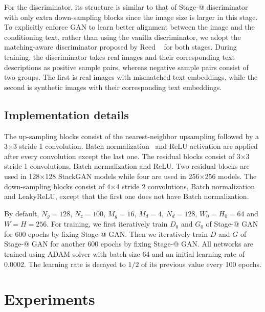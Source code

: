 \documentclass[10pt,twocolumn,letterpaper]{article}
\makeatletter
\newcommand{\Rmnum}[1]{\expandafter\@slowromancap\romannumeral #1@}
\makeatother
\begin{document}
For the discriminator, its structure is similar to that of Stage-\Rmnum{1} discriminator with only extra down-sampling blocks since the image size is larger in this stage.  
To explicitly enforce GAN to learn better alignment between the image and the conditioning text, rather than using the vanilla discriminator, we adopt the matching-aware discriminator proposed by Reed \etal~\cite{reed2016generative} for both stages. 
During training, the discriminator takes real images and their corresponding text descriptions as positive sample pairs, whereas negative sample pairs consist of two groups. 
The first is real images with mismatched text embeddings, while the second is synthetic images with their corresponding text embeddings. 

\vspace{-2pt}
\subsection{Implementation details}
\vspace{-5pt}

The up-sampling blocks consist of the nearest-neighbor upsampling followed by a 3$\times$3 stride 1 convolution. Batch normalization~\cite{IoffeS15} and ReLU activation are applied after every convolution except the last one.  The residual blocks consist of  3$\times$3 stride 1 convolutions, Batch normalization and ReLU. Two residual blocks are used in 128$\times$128 StackGAN models while four are used in 256$\times$256 models. The down-sampling blocks consist of 4$\times$4 stride 2 convolutions, Batch normalization and LeakyReLU, except that the first one does not have Batch normalization.

By default, $N_g=128$,  $N_z=100$, $M_g=16$,  $M_d=4$, $N_d=128$,  $W_{0}=H_{0} = 64$ and $W=H=256$. 
For training, we first iteratively train $D_0$ and $G_0$ of Stage-\Rmnum{1} GAN for 600 epochs by fixing Stage-\Rmnum{2} GAN.
Then we iteratively train $D$ and $G$ of Stage-\Rmnum{2} GAN for another 600 epochs by fixing Stage-\Rmnum{1} GAN. 
All networks are trained using ADAM solver with batch size 64 and an initial learning rate of 0.0002.  
The learning rate is decayed to $1/2$ of its previous value every 100 epochs. 




\section{Experiments}
\vspace{-5pt}
\end{document}
